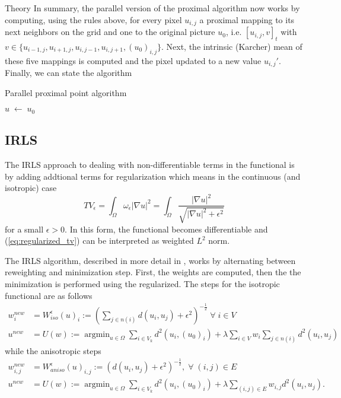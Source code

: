 \begin{chapter}{Theory}
In summary, the parallel version of the proximal algorithm now works by computing, using the rules above, for every pixel $u_{i,j}$ a proximal mapping to its next neighbors on the grid and one
to the original picture $u_0$, i.e. $[u_{i,j}, v]_t$ with $v\in\lbrace u_{i-1,j},u_{i+1,j},u_{i,j-1}, u_{i,j+1}, (u_0)_{i,j}\rbrace$. Next, the intrinsic (Karcher) mean \cite{Karcher} of 
these five mappings is computed and the pixel updated to a new value $u_{i,j}'$.\\

Finally, we can state the algorithm

\begin{algorithm}
\caption{Parallel proximal point algorithm}
\label{eq:parallel_prpt}
\begin{algorithmic}
    \STATE $u\; \leftarrow\;u_0$
\end{algorithmic}
\end{algorithm}



\subsection{IRLS} %
\label{sub:IRLS}
The IRLS approach to dealing with non-differentiable terms in the functional is by adding addtional terms for regularization which means in the continuous (and isotropic) case 
\begin{equation}
    \label{eq:regulzarized_tv}
    TV_{\epsilon}=\int_{\Omega}\omega_{\epsilon}|\nabla u|^2 =\int_{\Omega}\frac{|\nabla u|^2}{\sqrt{|\nabla u|^2+\epsilon^2}}
\end{equation}
for a small $\epsilon>0$. In this form, the functional becomes differentiable and (\ref{eq:regularized_tv}) can be interpreted as weighted $L^2$ norm.

The IRLS algorithm, described in more detail in \cite{Rodriguez}, works by alternating between reweighting and minimization step. First, the weights are computed, then 
the the minimization is performed using the regularized. The steps for the isotropic functional are as follows
\begin{align}
    w_{i}^{new} &= W^{\epsilon}_{iso}(u)_i := \left( \sum_{j\in n(i)}d(u_i,u_j)+\epsilon^2\right)^{-\frac{1}{2}}\; \forall\;i\in V \\
    u^{new} &= U(w) := \operatorname{argmin}_{u\in\Omega}\sum_{i\in V_k}d^2(u_i,(u_0)_{i})+\lambda\sum_{i\in V}w_i\sum_{j\in n(i)}d^2(u_i,u_j)
\end{align}
while the anisotropic steps
\begin{align}
    w_{i,j}^{new} &= W^{\epsilon}_{aniso}(u)_{i,j} := \left( d(u_i,u_j)+\epsilon^2\right)^{-\frac{1}{2}},\; \forall\;(i,j)\in E \\
    u^{new} &= U(w) := \operatorname{argmin}_{u\in\Omega}\sum_{i\in V_k}d^2(u_i,(u_0)_{i})+\lambda\sum_{(i,j)\in E}w_{i,j}d^2(u_i,u_j).
\end{align}


\end{chapter}
